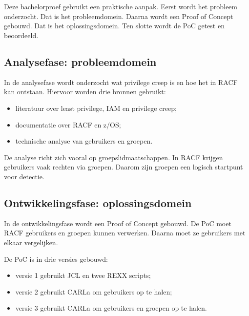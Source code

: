
\chapter[Methodologie]{}%
\label{ch:methodologie}

Deze bachelorproef gebruikt een praktische aanpak. Eerst wordt het probleem onderzocht. Dat is het probleemdomein. Daarna wordt een Proof of Concept gebouwd. Dat is het oplossingsdomein. Ten slotte wordt de PoC getest en beoordeeld.

\section{Analysefase: probleemdomein}

In de analysefase wordt onderzocht wat privilege creep is en hoe het in RACF kan ontstaan. Hiervoor worden drie bronnen gebruikt:

\begin{itemize}
	\item literatuur over least privilege, IAM en privilege creep;
	\item documentatie over RACF en z/OS;
	\item technische analyse van gebruikers en groepen.
\end{itemize}

De analyse richt zich vooral op groepslidmaatschappen. In RACF krijgen gebruikers vaak rechten via groepen. Daarom zijn groepen een logisch startpunt voor detectie.

\section{Ontwikkelingsfase: oplossingsdomein}

In de ontwikkelingsfase wordt een Proof of Concept gebouwd. De PoC moet RACF gebruikers en groepen kunnen verwerken. Daarna moet ze gebruikers met elkaar vergelijken.

De PoC is in drie versies gebouwd:

\begin{itemize}
	\item versie 1 gebruikt JCL en twee REXX scripts;
	\item versie 2 gebruikt CARLa om gebruikers op te halen;
	\item versie 3 gebruikt CARLa om gebruikers en groepen op te halen.
\end{itemize}

